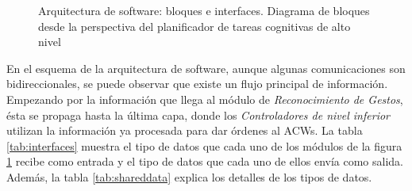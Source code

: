 \documentclass[fontsize=11pt, English=false, Español=true, Myfinal=true, twoside, numbers=noenddot]{scrbook}
\begin{document}
\begin{figure}[ht]
{}
	\caption{Arquitectura de software: bloques e interfaces. Diagrama de bloques desde la perspectiva del planificador de tareas cognitivas de alto nivel}
	\label{fig:NodeDiagram}
\end{figure}

En el esquema de la arquitectura de software, aunque algunas comunicaciones son bidireccionales, se puede observar que existe un flujo principal de información. Empezando por la información que llega al módulo de \emph{Reconocimiento de Gestos}, ésta se propaga hasta la última capa, donde los \emph{Controladores de nivel inferior} utilizan la información ya procesada para dar órdenes al \glspl{ACW}. La tabla \ref{tab:interfaces} muestra el tipo de datos que cada uno de los módulos de la figura \ref{fig:NodeDiagram} recibe como entrada y el tipo de datos que cada uno de ellos envía como salida. Además, la tabla \ref{tab:shareddata} explica los detalles de los tipos de datos. 
\end{document}
